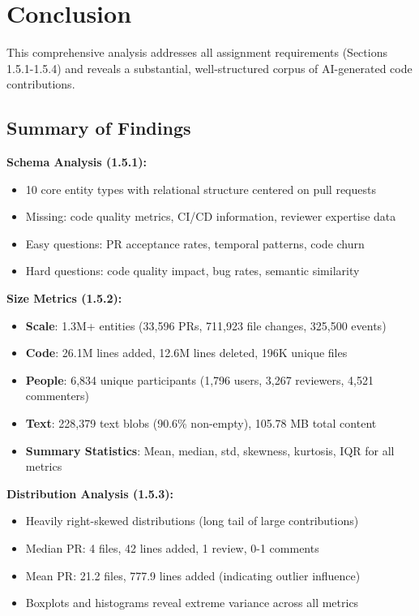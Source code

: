 \documentclass[11pt]{article}
\begin{document}
\section{Conclusion}

This comprehensive analysis addresses all assignment requirements (Sections 1.5.1-1.5.4) and reveals a substantial, well-structured corpus of AI-generated code contributions.

\subsection{Summary of Findings}

\textbf{Schema Analysis (1.5.1):}
\begin{itemize}
    \item 10 core entity types with relational structure centered on pull requests
    \item Missing: code quality metrics, CI/CD information, reviewer expertise data
    \item Easy questions: PR acceptance rates, temporal patterns, code churn
    \item Hard questions: code quality impact, bug rates, semantic similarity
\end{itemize}

\textbf{Size Metrics (1.5.2):}
\begin{itemize}
    \item \textbf{Scale}: 1.3M+ entities (33,596 PRs, 711,923 file changes, 325,500 events)
    \item \textbf{Code}: 26.1M lines added, 12.6M lines deleted, 196K unique files
    \item \textbf{People}: 6,834 unique participants (1,796 users, 3,267 reviewers, 4,521 commenters)
    \item \textbf{Text}: 228,379 text blobs (90.6\% non-empty), 105.78 MB total content
    \item \textbf{Summary Statistics}: Mean, median, std, skewness, kurtosis, IQR for all metrics
\end{itemize}

\textbf{Distribution Analysis (1.5.3):}
\begin{itemize}
    \item Heavily right-skewed distributions (long tail of large contributions)
    \item Median PR: 4 files, 42 lines added, 1 review, 0-1 comments
    \item Mean PR: 21.2 files, 777.9 lines added (indicating outlier influence)
    \item Boxplots and histograms reveal extreme variance across all metrics
\end{itemize}
\end{document}

